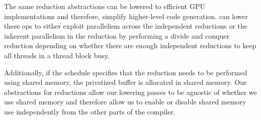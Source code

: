 The same reduction abstractions can be lowered to efficient GPU implementations
and therefore, simplify higher-level code generation. 
%
\Treebeard{} can lower these ops to either exploit
parallelism across the independent reductions or 
the inherent parallelism in the reduction by performing a divide and conquer 
reduction depending on whether there are enough independent reductions to keep all threads
in a thread block busy.

Additionally, if the schedule specifies that the reduction needs to be performed 
using shared memory, the privatized buffer is allocated in shared memory. 
Our abstractions for reductions allow our lowering passes to be 
agnostic of whether we use shared memory and therefore allow 
us to enable or disable shared memory use independently from the other 
parts of the compiler. 


